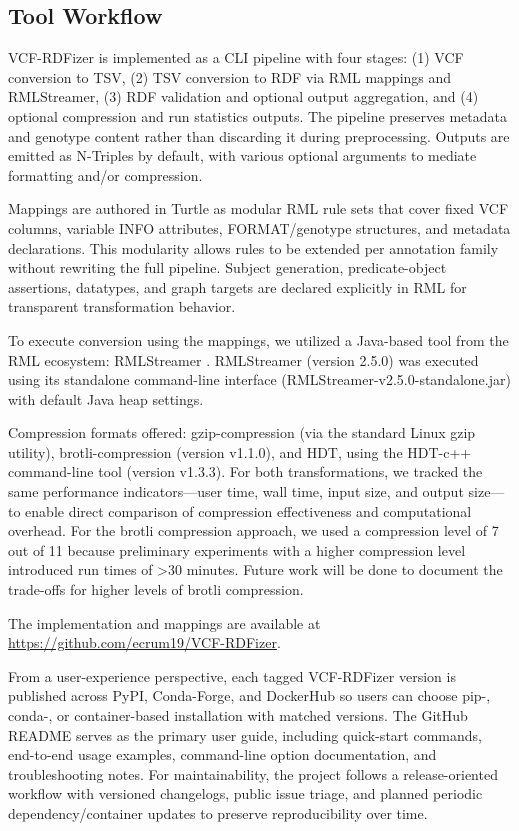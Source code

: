 \documentclass[unnumsec,webpdf,contemporary,large]{oup-authoring-template}
\begin{document}
\subsection{Tool Workflow}\label{subsec2.2}
VCF-RDFizer is implemented as a CLI pipeline with four stages: 
(1) VCF conversion to TSV, 
(2) TSV conversion to RDF via RML mappings and RMLStreamer, 
(3) RDF validation and optional output aggregation, 
and (4) optional compression and run statistics outputs. 
The pipeline preserves metadata and genotype content rather than discarding it during preprocessing. 
Outputs are emitted as N-Triples by default, with various optional arguments to mediate formatting and/or compression.

Mappings are authored in Turtle as modular RML rule sets that cover fixed VCF columns, variable INFO attributes, FORMAT/genotype structures, and metadata declarations. 
This modularity allows rules to be extended per annotation family without rewriting the full pipeline. 
Subject generation, predicate-object assertions, datatypes, and graph targets are declared explicitly in RML for transparent transformation behavior.

To execute conversion using the mappings, we utilized a Java-based tool from the RML ecosystem: RMLStreamer \cite{rmlstreamer_2022}. 
RMLStreamer (version 2.5.0) was executed using its standalone command-line interface (RMLStreamer-v2.5.0-standalone.jar) with default Java heap settings. 

Compression formats offered: gzip-compression (via the standard Linux gzip utility), brotli-compression \cite{brotli_2019} (version v1.1.0), and HDT, using the HDT-c++ command-line tool \cite{hdt_2013} (version v1.3.3). 
For both transformations, we tracked the same performance indicators—user time, wall time, input size, and output size—to enable direct comparison of compression effectiveness and computational overhead.
For the brotli compression approach, we used a compression level of 7 out of 11 because preliminary experiments with a higher compression level introduced run times of >30 minutes.
Future work will be done to document the trade-offs for higher levels of brotli compression.

The implementation and mappings are available at \url{https://github.com/ecrum19/VCF-RDFizer}. 

From a user-experience perspective, each tagged VCF-RDFizer version is published across PyPI, Conda-Forge, and DockerHub so users can choose pip-, conda-, or container-based installation with matched versions.
The GitHub README serves as the primary user guide, including quick-start commands, end-to-end usage examples, command-line option documentation, and troubleshooting notes.
For maintainability, the project follows a release-oriented workflow with versioned changelogs, public issue triage, and planned periodic dependency/container updates to preserve reproducibility over time.
\end{document}
